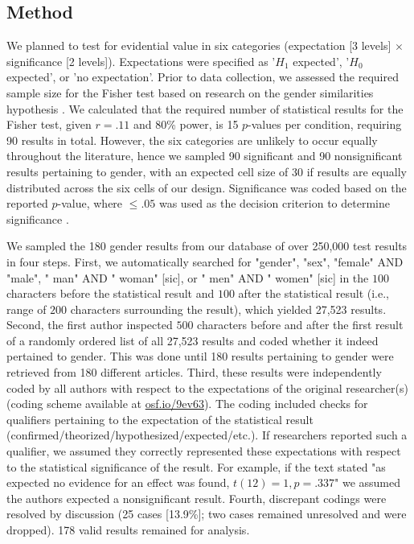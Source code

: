 \documentclass{article}
\begin{document}
\subsection*{Method}

We planned to test for evidential value in six categories (expectation [3 levels] $\times$ significance [2 levels]). Expectations were specified as '$H_1$ expected', '$H_0$ expected', or 'no expectation'. Prior to data collection, we assessed the required sample size for the Fisher test based on research on the gender similarities hypothesis \cite{Hyde2005-gj}. We calculated that the required number of statistical results for the Fisher test, given $r=.11$ \cite{Hyde2005-gj} and 80\% power, is 15 $p$-values per condition, requiring 90 results in total. However, the six categories are unlikely to occur equally throughout the literature, hence we sampled 90 significant and 90 nonsignificant results pertaining to gender, with an expected cell size of 30 if results are equally distributed across the six cells of our design. Significance was coded based on the reported $p$-value, where $\leq.05$ was used as the decision criterion to determine significance \cite{Nuijten2015-od}.

We sampled the 180 gender results from our database of over 250,000 test results in four steps. First, we automatically searched for "gender", "sex", "female" AND "male", " man" AND " woman" [sic], or " men" AND " women" [sic] in the $100$ characters before the statistical result and $100$ after the statistical result (i.e., range of $200$ characters surrounding the result), which yielded 27,523 results. Second, the first author inspected $500$ characters before and after the first result of a randomly ordered list of all 27,523 results and coded whether it indeed pertained to gender. This was done until 180 results pertaining to gender were retrieved from 180 different articles. Third, these results were independently coded by all authors with respect to the expectations of the original researcher(s) (coding scheme available at \url{osf.io/9ev63}). The coding included checks for qualifiers pertaining to the expectation of the statistical result (confirmed/theorized/hypothesized/expected/etc.). If researchers reported such a qualifier, we assumed they correctly represented these expectations with respect to the statistical significance of the result. For example, if the text stated "as expected no evidence for an effect was found, $t(12)=1, p=.337$" we assumed the authors expected a nonsignificant result. Fourth, discrepant codings were resolved by discussion (25 cases [13.9\%]; two cases remained unresolved and were dropped). 178 valid results remained for analysis.
\end{document}

